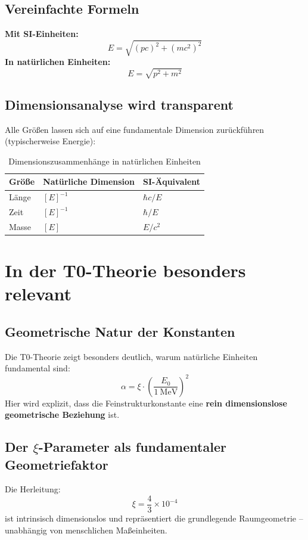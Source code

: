 	\subsection{Vereinfachte Formeln}
	\textbf{Mit SI-Einheiten:}
	\begin{equation}
		E = \sqrt{(p c)^2 + (m c^2)^2}
	\end{equation}
	\textbf{In natürlichen Einheiten:}
	\begin{equation}
		E = \sqrt{p^2 + m^2}
	\end{equation}
	
	\subsection{Dimensionsanalyse wird transparent}
	Alle Größen lassen sich auf eine fundamentale Dimension zurückführen (typischerweise Energie):
	\begin{table}[h]
		\centering
		\begin{tabular}{lll}
			\toprule
			\textbf{Größe} & \textbf{Natürliche Dimension} & \textbf{SI-Äquivalent} \\
			\midrule
			Länge & $[E]^{-1}$ & $\hbar c / E$ \\
			Zeit & $[E]^{-1}$ & $\hbar / E$ \\
			Masse & $[E]$ & $E/c^2$ \\
			\bottomrule
		\end{tabular}
		\caption{Dimensionszusammenhänge in natürlichen Einheiten}
	\end{table}
	
	\section{In der T0-Theorie besonders relevant}
	
	\subsection{Geometrische Natur der Konstanten}
	Die T0-Theorie zeigt besonders deutlich, warum natürliche Einheiten fundamental sind:
	\begin{equation}
		\alpha = \xi \cdot \left( \frac{E_0}{1~\mathrm{MeV}} \right)^2
	\end{equation}
	Hier wird explizit, dass die Feinstrukturkonstante eine \textbf{rein dimensionslose geometrische Beziehung} ist.
	
	\subsection{Der $\xi$-Parameter als fundamentaler Geometriefaktor}
	Die Herleitung:
	\begin{equation}
		\xi = \frac{4}{3} \times 10^{-4}
	\end{equation}
	ist intrinsisch dimensionslos und repräsentiert die grundlegende Raumgeometrie -- unabhängig von menschlichen Maßeinheiten.
	
